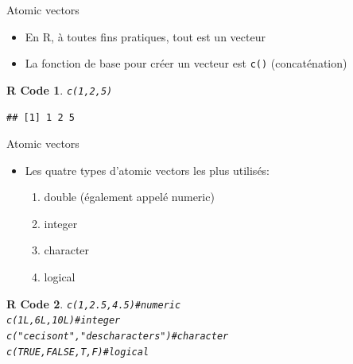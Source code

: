 \documentclass[11pt]{beamer}\usepackage[]{graphicx}\usepackage[]{color}
\makeatletter
\newcommand{\hlnum}[1]{\textcolor[rgb]{0.063,0.58,0.627}{#1}}%
\newcommand{\hlstr}[1]{\textcolor[rgb]{0.063,0.58,0.627}{#1}}%
\newcommand{\hlcom}[1]{\textcolor[rgb]{0.588,0.588,0.588}{#1}}%
\newcommand{\hlstd}[1]{\textcolor[rgb]{0.196,0.196,0.196}{#1}}%
\newcommand{\hlkwd}[1]{\textcolor[rgb]{0.78,0.227,0.412}{#1}}%
\newenvironment{kframe}{%
 \def\at@end@of@kframe{}%
 \ifinner\ifhmode%
  \def\at@end@of@kframe{\end{minipage}}%
  \begin{minipage}{\columnwidth}%
 \fi\fi%
 \def\FrameCommand##1{\hskip\@totalleftmargin \hskip-\fboxsep
 \colorbox{shadecolor}{##1}\hskip-\fboxsep
     \hskip-\linewidth \hskip-\@totalleftmargin \hskip\columnwidth}%
 \MakeFramed {\advance\hsize-\width
   \@totalleftmargin\z@ \linewidth\hsize
   \@setminipage}}%
 {\par\unskip\endMakeFramed%
 \at@end@of@kframe}
\newenvironment{knitrout}{}{} %
\newtheorem{rcode}{R Code}[section]
\newcommand{\code}[1]{\texttt{#1}}
\makeatother
\begin{document}
\begin{frame}[fragile]{Atomic vectors}

\begin{itemize}
  \setlength\itemsep{2em}
\item En R, à toutes fins pratiques, tout est un vecteur
\pause \item La fonction de base pour créer un vecteur est \code{c()} (concaténation)
\end{itemize}
\pause
\begin{knitrout}
\color{fgcolor}\begin{kframe}
\begin{rcode}\begin{alltt}
\hlkwd{c}\hlstd{(}\hlnum{1}\hlstd{,} \hlnum{2}\hlstd{,} \hlnum{5}\hlstd{)}
\end{alltt}
\begin{verbatim}
## [1] 1 2 5
\end{verbatim}
\end{rcode}\end{kframe}
\end{knitrout}

\end{frame}




\begin{frame}[fragile]{Atomic vectors}

\begin{itemize}
  \setlength\itemsep{2em}
\item Les quatre types d'atomic vectors les plus utilisés: 
\begin{enumerate}
\item double (également appelé numeric)
\item integer
\item character
\item logical
\end{enumerate}
\end{itemize}
\pause
\begin{knitrout}
\color{fgcolor}\begin{kframe}
\begin{rcode}\begin{alltt}
\hlkwd{c}\hlstd{(}\hlnum{1}\hlstd{,} \hlnum{2.5}\hlstd{,} \hlnum{4.5}\hlstd{)} \hlcom{# numeric}
\hlkwd{c}\hlstd{(}\hlnum{1L}\hlstd{,} \hlnum{6L}\hlstd{,} \hlnum{10L}\hlstd{)} \hlcom{# integer}
\hlkwd{c}\hlstd{(}\hlstr{"ceci sont"}\hlstd{,} \hlstr{"des characters"}\hlstd{)} \hlcom{#character}
\hlkwd{c}\hlstd{(}\hlnum{TRUE}\hlstd{,} \hlnum{FALSE}\hlstd{, T, F)} \hlcom{# logical}
\end{alltt}
\end{rcode}\end{kframe}
\end{knitrout}

\end{frame}
\end{document}
